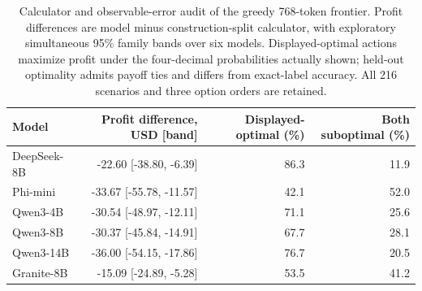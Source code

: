\begin{table}[t]
\centering\small
\caption{Calculator and observable-error audit of the greedy 768-token frontier. Profit differences are model minus construction-split calculator, with exploratory simultaneous 95\% family bands over six models. Displayed-optimal actions maximize profit under the four-decimal probabilities actually shown; held-out optimality admits payoff ties and differs from exact-label accuracy. All 216 scenarios and three option orders are retained.}
\label{tab:calculatorerroraudit}
\setlength{\tabcolsep}{4pt}
\begin{tabular}{lrrr}
\toprule
Model & Profit difference, USD [band] & Displayed-optimal (\%) & Both suboptimal (\%) \\
\midrule
DeepSeek-8B & -22.60 [-38.80, -6.39] & 86.3 & 11.9 \\
Phi-mini & -33.67 [-55.78, -11.57] & 42.1 & 52.0 \\
Qwen3-4B & -30.54 [-48.97, -12.11] & 71.1 & 25.6 \\
Qwen3-8B & -30.37 [-45.84, -14.91] & 67.7 & 28.1 \\
Qwen3-14B & -36.00 [-54.15, -17.86] & 76.7 & 20.5 \\
Granite-8B & -15.09 [-24.89, -5.28] & 53.5 & 41.2 \\
\bottomrule
\end{tabular}
\end{table}
